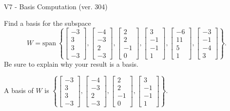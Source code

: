 \begin{exercise}
  \begin{exerciseTitle}V7 - Basis Computation (ver. 304)\end{exerciseTitle}
  \begin{exerciseStatement}
    Find a basis for the subspace 
\[W=\mathrm{span}\ \left\{\left[\begin{array}{r}
-3 \\
3 \\
3 \\
-3
\end{array}\right] , \left[\begin{array}{r}
-4 \\
-3 \\
2 \\
-3
\end{array}\right] , \left[\begin{array}{r}
2 \\
2 \\
-1 \\
0
\end{array}\right] , \left[\begin{array}{r}
3 \\
-1 \\
-1 \\
1
\end{array}\right] , \left[\begin{array}{r}
-6 \\
11 \\
5 \\
1
\end{array}\right] , \left[\begin{array}{r}
-3 \\
-1 \\
-4 \\
3
\end{array}\right]\right\}.\]
 Be sure to explain why your result is a basis.


  \end{exerciseStatement}
  \begin{exerciseAnswer}
   A basis of \(W\) is  \(\left\{\left[\begin{array}{r}
-3 \\
3 \\
3 \\
-3
\end{array}\right] , \left[\begin{array}{r}
-4 \\
-3 \\
2 \\
-3
\end{array}\right] , \left[\begin{array}{r}
2 \\
2 \\
-1 \\
0
\end{array}\right] , \left[\begin{array}{r}
3 \\
-1 \\
-1 \\
1
\end{array}\right]\right\}\).
  


  \end{exerciseAnswer}
\end{exercise}